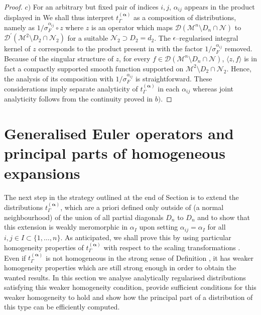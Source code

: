 \documentclass[10pt]{book}
\newcommand{\Dcal}{\mathcal{D}}
\newcommand{\Mcal}{\mathcal{M}}
\newcommand{\Ncal}{\mathcal{N}}
\theoremstyle{break}
\begin{document}
\begin{proof}
$c)$ 
For an arbitrary but fixed pair of indices $i,j$, $\alpha_{ij}$ appears in the product displayed in %
We shall thus interpret $t_\Gamma^{(\boldsymbol{\alpha})}$ as a composition of distributions, namely as $1/\sigma_F^{\alpha_{ij}}\circ z $
where $z$ is an operator which maps $\Dcal(\Mcal^{n}\setminus D_{n}\cap \Ncal)$ to $ \Dcal^\prime(\Mcal^{2}\setminus D_2\cap \Ncal_2)$ for a suitable $\Ncal_2\supset D_2=d_2$. The $\epsilon$--regularised integral kernel of $z$ corresponds to the product present in %
with the factor  $1/\sigma_F^{\alpha_{ij}}$ removed. Because of the singular structure of $z$, for every $f\in \Dcal(\Mcal^{n}\setminus D_{n}\cap \Ncal)$, $\langle z,f\rangle$ is in fact a compactly supported smooth function supported on $\Mcal^{2}\setminus D_2\cap \Ncal_2$. Hence, the analysis of its composition with $1/\sigma_F^{\alpha_{ij}}$ is straightforward. These considerations imply separate analyticity of $t_\Gamma^{(\boldsymbol{\alpha})}$ in each $\alpha_{ij}$ whereas joint analyticity follows from the continuity proved in $b)$.
\end{proof}



\section{Generalised Euler operators and principal parts of homogeneous expansions}


The next step in the strategy outlined at the end of Section %
is to extend the distributions $t^{(\boldsymbol{\alpha})}_\Gamma$, which are a priori defined only outside of (a normal neighbourhood) of the union of all partial diagonals $D_n$ to $D_n$ and to show that this extension is weakly meromorphic in $\alpha_I$ upon setting $\alpha_{ij}=\alpha_I$ for all $i,j\in I\subset \{1,\ldots,n\}$. As anticipated, we shall prove this by using particular homogeneity properties of $t^{(\boldsymbol{\alpha})}_\Gamma$ with respect to the scaling transformations %
. Even if $t^{(\boldsymbol{\alpha})}_\Gamma$ is not homogeneous in the strong sense of Definition %
, it has weaker homogeneity properties which are still strong enough in order to obtain the wanted results. In this section we analyse analytically regularised distributions satisfying this weaker homogeneity condition, provide sufficient conditions for this weaker homogeneity to hold and show how the principal part of a 
distribution of this type can be efficiently computed.
\end{document}
